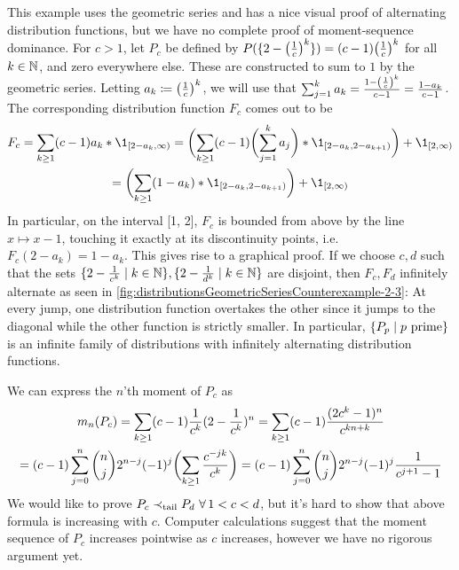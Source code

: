\documentclass[a4paper]{scrreprt}
\begin{document}
\begin{ex}
\begin{enumerate}
            \label{item:geometricSeriesSufficientTailOrderConditionCounterexample}
            This example uses the geometric series and has a nice visual proof of alternating distribution functions, but we have no complete proof of moment-sequence dominance.
            For $c > 1$, let $P_c$ be defined by $P(\{2-\bigl(\frac{1}{c}\bigr)^k\}) = (c-1)\bigl(\frac{1}{c}\bigr)^k$ for all $k \in \mathbb{N}$, and zero everywhere else.
            These are constructed to sum to $1$ by the geometric series.
            Letting $a_k \coloneqq \bigl(\frac{1}{c}\bigr)^k$, we will use that $\sum_{j = 1}^k  a_k = \frac{1 - \left(\frac{1}{c}\right)^k}{c - 1} = \frac{1 - a_k}{c - 1}$.
            The corresponding distribution function $F_c$ comes out to be 
            \begin{multline*}
                F_c 
                = \sum_{k \geq 1} (c-1) a_k * \1_{[2-a_k, \infty)}
                = \biggpars{\sum_{k \geq 1} (c-1) \biggpars{\sum_{j = 1}^k  a_j} * \1_{[2-a_k, 2-a_{k+1})}} + \1_{[2, \infty)} \\
                = \biggpars{\sum_{k \geq 1} (1-a_k) * \1_{[2-a_k, 2-a_{k+1})}} + \1_{[2, \infty)}
            \end{multline*}
            In particular, on the interval [1, 2], $F_c$ is bounded from above by the line $x \mapsto x-1$, touching it exactly at its discontinuity points, i.e. $F_c(2-a_k) = 1-a_k$. This gives rise to a graphical proof.
            If we choose $c, d$ such that the sets $\{2 - \frac{1}{c^k} \mid k \in \mathbb{N}\}, \{2 - \frac{1}{d^k} \mid k \in \mathbb{N}\}$ are disjoint,
            then $F_c, F_d$ infinitely alternate as seen in \autoref{fig:distributionsGeometricSeriesCounterexample-2-3}:
            At every jump, one distribution function overtakes the other since it jumps to the diagonal while the other function is strictly smaller.
            In particular, $\{P_p \mid p \text{ prime}\}$ is an infinite family of distributions with infinitely alternating distribution functions.
            
            We can express the $n$'th moment of $P_c$ as
            \begin{multline*}
                m_n(P_c) 
                = \sum_{k \geq 1} (c-1) \frac{1}{c^k} (2-\frac{1}{c^k})^n
                = \sum_{k \geq 1} (c-1) \frac{(2c^k-1)^n}{c^{kn+k}} \\
                = (c-1)\sum_{j=0}^n \binom{n}{j}2^{n-j}(-1)^j \biggl(\sum_{k \geq 1}\frac{c^{-jk}}{c^k}\biggr)
                = (c-1)\sum_{j=0}^n \binom{n}{j}2^{n-j}(-1)^j \frac{1}{c^{j+1}-1}
            \end{multline*}
            We would like to prove $P_c \prec_{\text{tail}} P_d ~ \forall\, 1 < c < d$, but it's hard to show that above formula is increasing with $c$.
            Computer calculations suggest that the moment sequence of $P_c$ increases pointwise as $c$ increases, however we have no rigorous argument yet.
          

\end{enumerate}
\end{ex}
\end{document}
